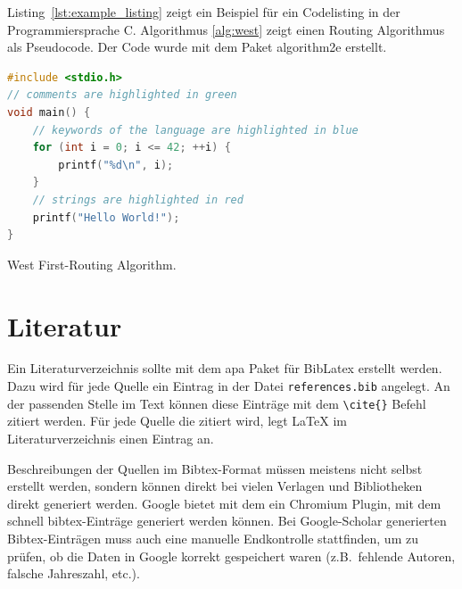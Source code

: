 Listing~\ref{lst:example_listing} zeigt ein Beispiel für ein Codelisting in der Programmiersprache C. Algorithmus \ref{alg:west} zeigt einen Routing Algorithmus als Pseudocode. Der Code wurde mit dem Paket algorithm2e \cite{algorithm2e} erstellt.

\begin{lstlisting}[language=C, caption=Beispiel für ein Codelisting in der Sprache C., label=lst:example_listing]
#include <stdio.h>
// comments are highlighted in green
void main() {
    // keywords of the language are highlighted in blue
    for (int i = 0; i <= 42; ++i) {
        printf("%d\n", i);
    }
    // strings are highlighted in red
    printf("Hello World!");
}
\end{lstlisting}

\begin{algorithm}[ht]

 \caption{West First-Routing Algorithm.}
 \label{alg:west}
\end{algorithm}

\section{Literatur}
Ein Literaturverzeichnis sollte mit dem apa Paket für BibLatex erstellt werden. Dazu wird für jede Quelle ein Eintrag in der Datei \texttt{references.bib} angelegt. An der passenden Stelle im Text können diese Einträge mit dem \texttt{\textbackslash cite\{\}} Befehl zitiert werden. Für jede Quelle die zitiert wird, legt \LaTeX{}  im Literaturverzeichnis einen Eintrag an.

Beschreibungen der Quellen im Bibtex-Format müssen meistens nicht selbst erstellt werden, sondern können direkt bei vielen Verlagen und Bibliotheken direkt generiert werden. Google bietet mit dem  ein Chromium Plugin, mit dem schnell bibtex-Einträge generiert werden können. Bei Google-Scholar generierten Bibtex-Einträgen muss auch eine manuelle Endkontrolle stattfinden, um zu prüfen, ob die Daten in Google korrekt gespeichert waren (z.B.~fehlende Autoren, falsche Jahreszahl, etc.).



